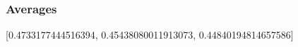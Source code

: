 \documentclass{article}
\begin{document}
\subsubsection{Averages}
[0.4733177444516394, 0.45438080011913073, 0.44840194814657586]

\begin{center}
\end{center}
\end{document}
